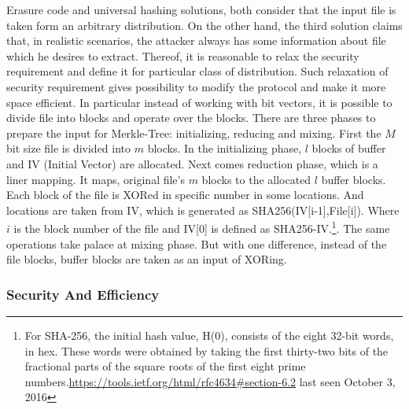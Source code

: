 \documentclass[12pt]{article}
\begin{document}
Erasure code and universal hashing solutions, both consider that the input file is taken form an arbitrary distribution. On the other hand, the third solution claims that, in realistic scenarios, the attacker always has some information about file which he desires to extract. Thereof, it is reasonable to relax the security requirement and define  it for particular class of distribution. Such relaxation of security requirement gives possibility to modify the protocol and make it more space efficient.  In particular instead of working with bit vectors, it is possible to divide file into blocks and operate over the blocks. There are three phases to prepare the input for Merkle-Tree: initializing, reducing and mixing. First the $M$ bit size file is divided into $m$ blocks. In the initializing phase, $l$ blocks of buffer and IV (Initial Vector) are allocated. Next comes reduction phase, which is a liner mapping. It maps, original file's $m$ blocks to the allocated $l$ buffer blocks. Each block of the file is XORed in specific number in some locations. And locations are taken from IV, which is generated as SHA256(IV[i-1],File[i]). Where $i$ is the block number of the file and IV[0] is defined as SHA256-IV.\footnote{For SHA-256, the initial hash value, H(0), consists of the eight 32-bit words, in hex. These words were obtained by taking the first thirty-two bits of the fractional parts of the square roots of the first eight prime numbers.\url{https://tools.ietf.org/html/rfc4634\#section-6.2} last seen October 3, 2016}. The same operations take palace at mixing phase. But with one difference, instead of the file blocks, buffer blocks are taken as an input of XORing. 
\subsubsection{Security And Efficiency}
\label{subsub:secAndeff1}
\end{document}
